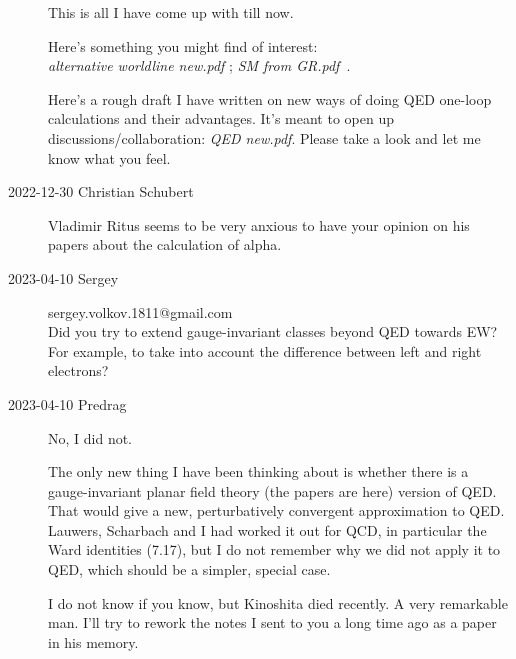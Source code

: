 \begin{description}
This is all I have come up with till now.

Here's something you might find of interest: \\
\emph{alternative worldline new.pdf} ;\;
\emph{SM from GR.pdf} \,.

Here's a rough draft I have written on new ways of doing QED one-loop calculations and their advantages. It's meant to open up discussions/collaboration:
\emph{QED new.pdf}.
Please take a look and let me know what you feel.

\item[2022-12-30 Christian Schubert]
Vladimir Ritus seems to be very anxious to have your opinion on
his papers about the calculation of alpha.

\item[2023-04-10 Sergey] sergey.volkov.1811@gmail.com \\
    Did you try to extend gauge-invariant classes beyond QED towards EW? For
    example, to take into account the difference between left and right
    electrons?
\item[2023-04-10 Predrag]
No, I did not.

The only new thing I have been thinking about is whether there is a
gauge-invariant planar field theory (the papers are
 {here}) version of
QED. That would give a new, perturbatively convergent approximation to
QED. Lauwers, Scharbach and I had worked it out for QCD, in particular the
Ward identities  (7.17), but I do not remember why we did not apply it to
QED, which should be a simpler, special case.

I do not know if you know, but Kinoshita died recently. A very remarkable
man. I'll try to rework the notes I sent to you a long time ago as a paper in
his memory.


\end{description}
